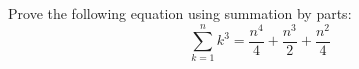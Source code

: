 \begin{exercise}{}
Prove the following equation using summation by parts:
\[ \sum_{k=1}^n k^3 = \frac{n^4}{4} + \frac{n^3}{2} + \frac{n^2}{4} \]
\end{exercise}




